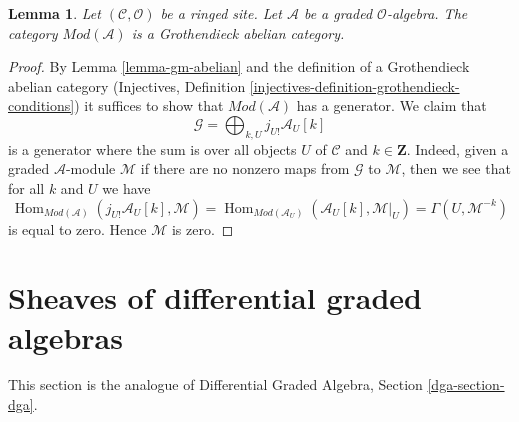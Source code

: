 \documentclass{stacks-project}
\theoremstyle{plain}
\newtheorem{lemma}[subsection]{Lemma}
\theoremstyle{definition}
\theoremstyle{remark}
\numberwithin{equation}{subsection}
\def\Hom{\mathop{\mathrm{Hom}}\nolimits}
\begin{document}
\begin{lemma}
\label{lemma-gm-grothendieck-abelian}
Let $(\mathcal{C}, \mathcal{O})$ be a ringed site.
Let $\mathcal{A}$ be a graded $\mathcal{O}$-algebra.
The category $\textit{Mod}(\mathcal{A})$ is a Grothendieck abelian category.
\end{lemma}

\begin{proof}
By Lemma \ref{lemma-gm-abelian} and the definition of a Grothendieck
abelian category
(Injectives, Definition \ref{injectives-definition-grothendieck-conditions})
it suffices to
show that $\textit{Mod}(\mathcal{A})$ has a generator. We claim that
$$
\mathcal{G} = \bigoplus\nolimits_{k, U} j_{U!}\mathcal{A}_U[k]
$$
is a generator where the sum is over all objects $U$ of $\mathcal{C}$
and $k \in \mathbf{Z}$. Indeed, given a graded $\mathcal{A}$-module
$\mathcal{M}$ if there are no nonzero maps from $\mathcal{G}$ to $\mathcal{M}$,
then we see that for all $k$ and $U$ we have
$$
\Hom_{\textit{Mod}(\mathcal{A})}(j_{U!}\mathcal{A}_U[k], \mathcal{M}) =
\Hom_{\textit{Mod}(\mathcal{A}_U)}(\mathcal{A}_U[k], \mathcal{M}|_U) =
\Gamma(U, \mathcal{M}^{-k})
$$
is equal to zero. Hence $\mathcal{M}$ is zero.
\end{proof}









\section{Sheaves of differential graded algebras}
\label{section-dga}

\noindent
This section is the analogue of
Differential Graded Algebra, Section \ref{dga-section-dga}.
\end{document}
